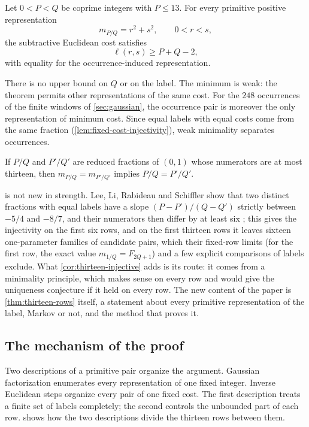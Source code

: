 \begin{theorem}\label{thm:thirteen-rows}
Let $0<P<Q$ be coprime integers with $P\leqslant13$. For every
primitive positive representation
$$
 m_{P/Q}=r^2+s^2,\qquad 0<r<s,
$$
the subtractive Euclidean cost satisfies
$$
 \ell(r,s)\geqslant P+Q-2,
$$
with equality for the occurrence-induced representation.
\end{theorem}

There is no upper bound on $Q$ or on the label. The minimum is weak:
the theorem permits other representations of the same cost. For the
$248$ occurrences of the finite windows of \cref{sec:gaussian}, the
occurrence pair is moreover the only representation of minimum cost.
Since equal labels with equal costs come from the same fraction
(\cref{lem:fixed-cost-injectivity}), weak minimality separates occurrences.

\begin{corollary}\label{cor:thirteen-injective}
If $P/Q$ and $P'/Q'$ are reduced fractions of $(0,1)$ whose numerators are
at most thirteen, then $m_{P/Q}=m_{P'/Q'}$ implies $P/Q=P'/Q'$.
\end{corollary}

 is not new in strength. Lee, Li, Rabideau
and Schiffler show that two distinct fractions with equal labels have a
slope $(P-P')/(Q-Q')$ strictly between $-5/4$ and $-8/7$, and their
numerators then differ by at least six
\cite[Corollary~1.5]{LeeEtAl2023}; this gives the injectivity on the first
six rows, and on the first thirteen rows it leaves sixteen one-parameter
families of candidate pairs, which their fixed-row limits
\cite[Lemma~6.4 and (6.4)]{LeeEtAl2023} (for the first row, the exact value
$m_{1/Q}=F_{2Q+1}$) and a few explicit comparisons of labels exclude. What \cref{cor:thirteen-injective} adds is its
route: it comes from a minimality principle, which makes sense on every row
and would give the uniqueness conjecture if it held on every row. The new
content of the paper is \cref{thm:thirteen-rows} itself, a statement about
every primitive representation of the label, Markov or not, and the method
that proves it.

\subsection{The mechanism of the proof}

Two descriptions of a primitive pair organize the argument. Gaussian
factorization enumerates every representation of one fixed integer.
Inverse Euclidean steps organize every pair of one fixed cost. The
first description treats a finite set of labels completely; the second
controls the unbounded part of each row.  shows how
the two descriptions divide the thirteen rows between them.

